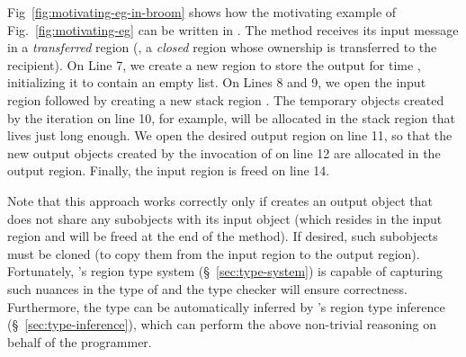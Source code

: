 Fig~\ref{fig:motivating-eg-in-broom} shows how the motivating example
of Fig.~\ref{fig:motivating-eg} can be written in \name. The
 method receives its input message in a
\emph{transferred} region (\ie, a \emph{closed} region whose ownership
is transferred to the recipient). On Line 7, we create a new region to
store the output for time , initializing it to contain an empty
list. On Lines 8 and 9, we open the input region  followed by
creating a new stack region . The temporary objects created by
the iteration on line 10, for example, will be allocated in the stack
region  that lives just long enough.  We open the desired output
region on line 11, so that the new output objects created by the
invocation of  on line 12 are allocated in the output
region.  Finally, the input region is freed on line 14.

Note that this approach works correctly only if  creates
an output object that does not share any subobjects with its input
object (which resides in the input region and will be freed at the end
of the method).  If desired, such subobjects must be cloned (to copy
them from the input region to the output region).  Fortunately,
\name's region type system (\S~\ref{sec:type-system}) is capable of
capturing such nuances in the type of  and the type
checker will ensure correctness.  Furthermore, the type can be
automatically inferred by \name's region type inference
(\S~\ref{sec:type-inference}), which can perform the above non-trivial
reasoning on behalf of the programmer.

